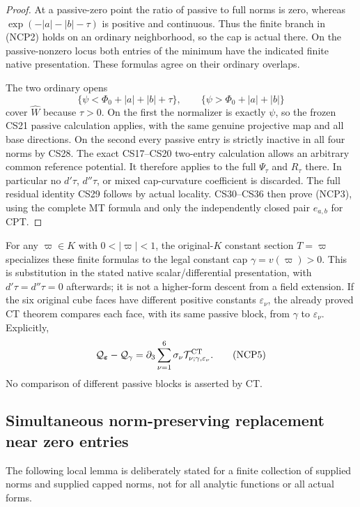 \begin{proof}
At a passive-zero point the ratio of passive to full norms is zero,
whereas $\exp(-|a|-|b|-\tau)$ is positive and continuous.  Thus the
finite branch in (NCP2) holds on an ordinary neighborhood, so the
cap is actual there.  On the passive-nonzero locus both entries of
the minimum have the indicated finite native presentation.  These
formulas agree on their ordinary overlaps.

The two ordinary opens
\[
 \{\psi<\Phi_0+|a|+|b|+\tau\},\qquad
 \{\psi>\Phi_0+|a|+|b|\}
 \tag{NCP4}
\]
cover $\widehat W$ because $\tau>0$.  On the first the normalizer
is exactly $\psi$, so the frozen CS21 passive calculation applies,
with the same genuine projective map and all base directions.
On the second every passive entry is strictly inactive in all four
norms by CS28.  The exact CS17--CS20 two-entry calculation allows
an arbitrary common reference potential.  It therefore applies to
the full $\Psi_\tau$ and $R_\tau$ there.  In particular no
$d'\tau$, $d''\tau$, or mixed cap-curvature coefficient is discarded.
The full residual identity CS29 follows by actual locality.  CS30--CS36
then prove (NCP3), using the complete MT formula and only the
independently closed pair $e_{a,b}$ for CPT.
\end{proof}

For any $\varpi\in K$ with $0<|\varpi|<1$, the original-$K$
constant section $T=\varpi$ specializes these finite formulas to
the legal constant cap $\gamma=v(\varpi)>0$.  This is substitution
in the stated native scalar/differential presentation, with
$d'\tau=d''\tau=0$ afterwards; it is not a higher-form descent
from a field extension.  If the six original cube faces have
different positive constants $\varepsilon_\nu$, the already proved
CT theorem compares each face, with its same passive block, from
$\gamma$ to $\varepsilon_\nu$.  Explicitly,
\[
 \mathcal Q_{\boldsymbol\varepsilon}
       -\mathcal Q_\gamma
   =\partial_3\sum_{\nu=1}^6\sigma_\nu
             \mathcal T^{\rm CT}_{\nu;\gamma,\varepsilon_\nu}.
 \tag{NCP5}
\]
No comparison of different passive blocks is asserted by CT.

\subsection{Simultaneous norm-preserving replacement near zero entries}

The following local lemma is deliberately stated for a finite
collection of supplied norms and supplied capped norms, not for
all analytic functions or all actual forms.

